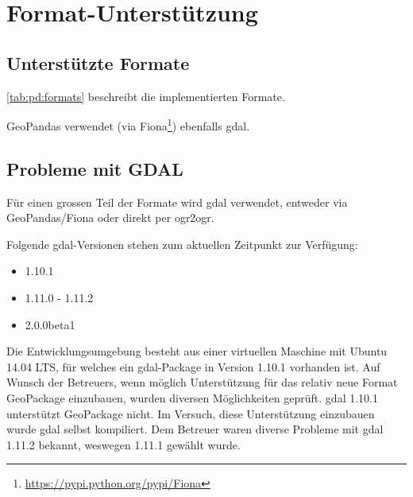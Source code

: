 \section{Format-Unterstützung}
\subsection{Unterstützte Formate}
\cref{tab:pd:formats} beschreibt die implementierten Formate.


GeoPandas verwendet (via Fiona\footnote{\url{https://pypi.python.org/pypi/Fiona}}) ebenfalls \gls{gdal}.

\subsection{Probleme mit GDAL}\label{sec:pd:format-gdal-problems}
Für einen grossen Teil der Formate wird \gls{gdal} verwendet, entweder via GeoPandas/Fiona oder direkt per ogr2ogr. 

Folgende \gls{gdal}-Versionen stehen zum aktuellen Zeitpunkt zur Verfügung:
\begin{itemize}
\item 1.10.1
\item 1.11.0 - 1.11.2
\item 2.0.0beta1
\end{itemize}

Die Entwicklungsumgebung besteht aus einer virtuellen Maschine mit Ubuntu 14.04 LTS, für welches ein \gls{gdal}-Package in Version 1.10.1 vorhanden ist. Auf Wunsch der Betreuers, wenn möglich Unterstützung für das relativ neue Format GeoPackage einzubauen, wurden diversen Möglichkeiten geprüft. \gls{gdal} 1.10.1 unterstützt GeoPackage nicht. Im Versuch, diese Unterstützung einzubauen wurde \gls{gdal} selbst kompiliert. Dem Betreuer waren diverse Probleme mit \gls{gdal} 1.11.2 bekannt, weswegen 1.11.1 gewählt wurde.

